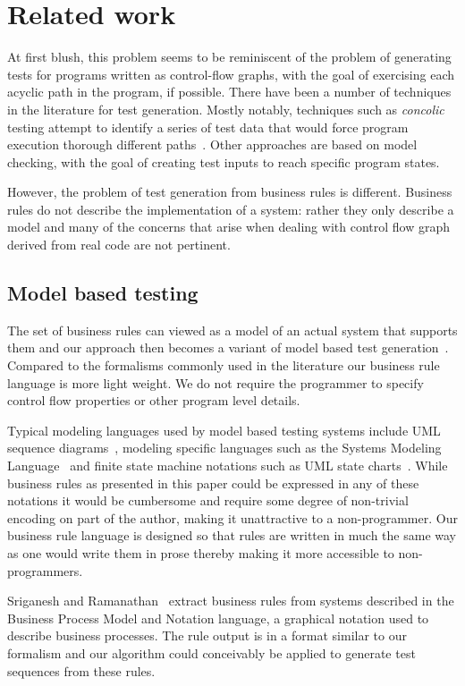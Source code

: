 \section{Related work}

At first blush, this problem seems to be reminiscent of the problem of
generating tests for programs written as control-flow graphs, with the
goal of exercising each acyclic path in the program, if possible.
There have been a number of techniques in the literature for test
generation. Mostly notably, techniques such as \textit{concolic}
testing attempt to identify a series of test data that would force
program execution thorough different paths~\cite{dart, concolic}.  Other
approaches are based on model checking, with the goal of creating test
inputs to reach specific program states.

However, the problem of test generation from business rules is
different. Business rules do not describe the implementation of a
system: rather they only describe a model and many of the concerns
that arise when dealing with control flow graph derived from real code
are not pertinent.

\subsection{Model based testing}

The set of business rules can viewed as a model of an actual system
that supports them and our approach then becomes a variant of model
based test generation~\cite{utting2012}. Compared to the formalisms commonly used in the
literature our business rule language is more light weight. We do not
require the programmer to specify control flow properties or other
program level details.

Typical modeling languages used by model based testing systems include
UML sequence diagrams~\cite{nayak2009}, modeling specific languages
such as the Systems Modeling Language~\cite{friedenthal2011} and
finite state machine notations such as UML
state charts~\cite{offhut99}. While business rules as presented in this
paper could be expressed in any of these notations it would be
cumbersome and require some degree of non-trivial encoding on part of
the author, making it unattractive to a non-programmer. Our business
rule language is designed so that rules are written in much the same
way as one would write them in prose thereby making it more accessible
to non-programmers.

Sriganesh and Ramanathan~\cite{sriganesh2012} extract business rules
from systems described in the Business Process Model and Notation
language, a graphical notation used to describe business
processes. The rule output is in a format similar to our formalism and
our algorithm could conceivably be applied to generate test sequences
from these rules.

